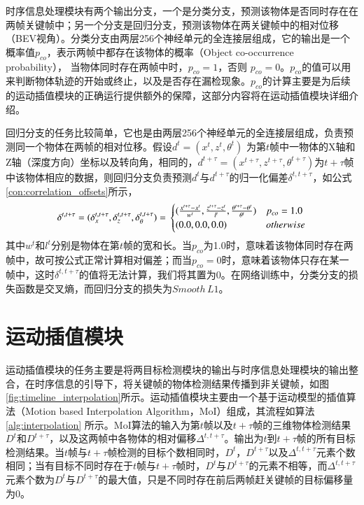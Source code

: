 时序信息处理模块有两个输出分支，一个是分类分支，预测该物体是否同时存在在两帧关键帧中；另一个分支是回归分支，预测该物体在两关键帧中的相对位移（BEV视角）。分类分支由两层256个神经单元的全连接层组成，它的输出是一个概率值$p_{co}$，表示两帧中都存在该物体的概率（Object co-occurrence probability）， 当物体同时存在两帧中时，$p_{co} = 1$，否则 $p_{co} = 0$。$p_{co}$的值可以用来判断物体轨迹的开始或终止，以及是否存在漏检现象。$p_{co}$的计算主要是为后续的运动插值模块的正确运行提供额外的保障，这部分内容将在运动插值模块详细介绍。

回归分支的任务比较简单，它也是由两层256个神经单元的全连接层组成，负责预测同一个物体在两帧的相对位移。假设$d^t = (x^t, z^t,\theta^t)$ 为第$t$帧中一物体的X轴和Z轴（深度方向）坐标以及转向角，相同的，$d^{t+\tau} = (x^{t+\tau}, z^{t+\tau},\theta^{t+\tau})$为$t+\tau$帧中该物体相应的数据，则回归分支负责预测$d^t$与$d^{t+\tau}$的归一化偏差$\delta^{t,t+\tau}$，如公式\ref{con:correlation_offsets}所示，
\begin{equation}
\delta^{t, t+\tau} = (\delta_x^{t,t+\tau}, \delta_z^{t,t+\tau}, \delta_{\theta}^{t,t+\tau}) = \\
\begin{cases}
(\frac{x^{t+\tau} - x^{t}}{w^t}, \frac{z^{t+\tau} - z^{t}}{l^t}, \frac{\theta^{t+\tau} - \theta^{t}}{\theta^t}) & p_{co} = 1.0 \\
(0.0,0.0, 0.0) &  otherwise
\end{cases}
\label{con:correlation_offsets}
\end{equation}
其中$w^t$和$l^t$分别是物体在第$t$帧的宽和长。当$p_{co}$为1.0时，意味着该物体同时存在两帧中，故可按公式正常计算相对偏差；而当$p_{co} = 0$时，意味着该物体只存在某一帧中，这时$\delta^{t,t+\tau}$的值将无法计算，我们将其置为0。在网络训练中，分类分支的损失函数是交叉熵，而回归分支的损失为$Smooth \, L1$。

\section{运动插值模块}
\label{interpolation}



运动插值模块的任务主要是将两目标检测模块的输出与时序信息处理模块的输出整合，在时序信息的引导下，将关键帧的物体检测结果传播到非关键帧，如图\ref{fig:timeline_interpolation}所示。运动插值模块主要由一个基于运动模型的插值算法（Motion based Interpolation Algorithm，MoI）组成，其流程如算法 \ref{alg:interpolation} 所示。MoI算法的输入为第$t$帧以及$t+\tau$帧的三维物体检测结果$D^t$和$D^{t+\tau}$，以及这两帧中各物体的相对偏移$\Delta^{t,t+\tau}$。输出为$t$到$t+\tau$帧的所有目标检测结果。当$t$帧与$t+\tau$帧检测的目标个数相同时，$D^t，D^{t+\tau}$以及$\Delta^{t,t+\tau}$元素个数相同；当有目标不同时存在于$t$帧与$t+\tau$帧时，$D^t$与$D^{t+\tau}$的元素不相等，而$\Delta^{t,t+\tau}$元素个数为$D^t$与$D^{t+\tau}$的最大值，只是不同时存在前后两帧赶关键帧的目标偏移量为0。

